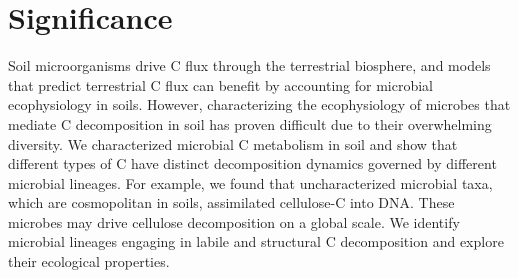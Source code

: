 \section{Significance} Soil microorganisms drive C flux through the terrestrial
biosphere, and models that predict terrestrial C flux can benefit by accounting
for microbial ecophysiology in soils. However, characterizing the ecophysiology
of microbes that mediate C decomposition in soil has proven difficult due to
their overwhelming diversity. We characterized microbial C metabolism in soil
and show that different types of C have distinct decomposition dynamics
governed by different microbial lineages. For example, we found that
uncharacterized microbial taxa, which are cosmopolitan in soils, assimilated
cellulose-C into DNA. These microbes may drive cellulose decomposition on
a global scale. We identify microbial lineages engaging in labile and
structural C decomposition and explore their ecological properties.
